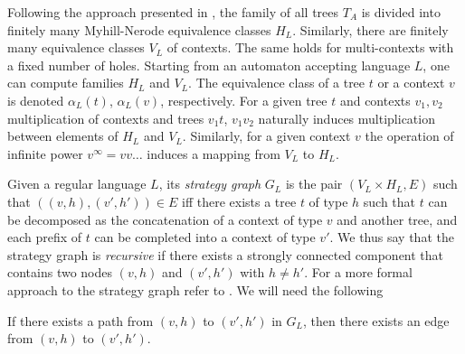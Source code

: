 Following the approach presented in \cite{bp}, the family of all trees $T_A$ is divided into finitely many Myhill-Nerode equivalence classes $H_L$. Similarly, there are finitely many equivalence classes $V_L$ of contexts. The same holds for multi-contexts with a fixed number of holes. Starting from an automaton accepting language $L$, one can compute families $H_L$ and $V_L$. The equivalence class of a tree $t$ or a context $v$ is denoted $\alpha_L(t)$, $\alpha_L(v)$, respectively. For a given tree $t$ and contexts $v_1,v_2$ multiplication of contexts and trees $v_1t$, $v_1v_2$ naturally induces multiplication between elements of $H_L$ and $V_L$. Similarly, for a given context $v$ the operation of infinite power $v^\infty = vv\ldots$ induces a mapping from $V_L$ to $H_L$. 

Given a regular language $L$, its \emph{strategy graph} $G_L$ is the pair $(V_L \times H_L, E)$ such that 
$((v,h),(v',h')) \in E$ iff there exists a tree $t$ of type
$h$ such that  $t$ can be decomposed as the concatenation of a context of type $v$ and another tree, and 
each prefix of $t$ can be completed into a context of type $v'$.
We thus say that the strategy graph is \emph{recursive} if there exists a strongly connected component that contains two nodes $(v, h)$ and $(v', h')$ with $h \neq h'$.
For a more formal approach to the strategy graph refer to \cite[Section G]{bp}. We will need the following 
\begin{proposition}[\cite{bp}]
\label{proposition:path to edge}
If there exists a path from $(v,h)$ to $(v',h')$ in $G_L$, then there exists an edge from $(v,h)$ to $(v',h')$.
\end{proposition}
